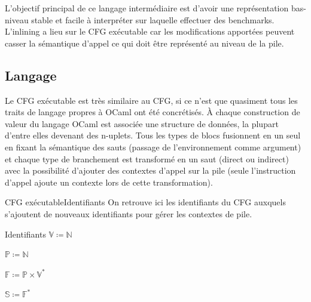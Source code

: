 \documentclass{beamer}
\begin{document}
\iffalse
L'objectif principal de ce langage intermédiaire est d'avoir une représentation bas-niveau stable et facile à interpréter sur laquelle effectuer des benchmarks. L'inlining a lieu sur le CFG exécutable car les modifications apportées peuvent casser la sémantique d'appel ce qui doit être représenté au niveau de la pile.

\subsection{Langage}

Le CFG exécutable est très similaire au CFG, si ce n'est que quasiment tous les traits de langage propres à OCaml ont été concrétisés. À chaque construction de valeur du langage OCaml est associée une structure de données, la plupart d'entre elles devenant des n-uplets. Tous les types de blocs fusionnent en un seul en fixant la sémantique des sauts (passage de l'environnement comme argument) et chaque type de branchement est transformé en un saut (direct ou indirect) avec la possibilité d'ajouter des contextes d'appel sur la pile (seule l'instruction d'appel ajoute un contexte lors de cette transformation).

\begin{frame}{CFG exécutable}{Identifiants}
    On retrouve ici les identifiants du CFG auxquels s'ajoutent de nouveaux identifiants pour gérer les contextes de pile.
    
    \begin{block}{Identifiants}
        $\mathbb{V} \coloneqq \mathbb{N}$%
        
        $\mathbb{P} \coloneqq \mathbb{N}$%
        
        $\mathbb{F} \coloneqq \mathbb{P} \times \mathbb{V}^{*}$%
        
        $\mathbb{S} \coloneqq \mathbb{F}^{*}$%
    \end{block}
\end{frame}
\end{document}
